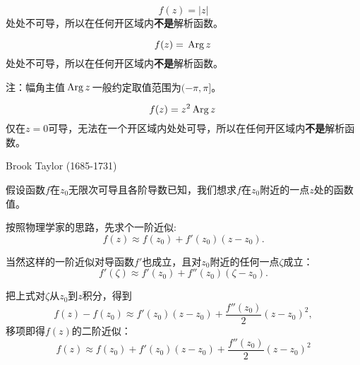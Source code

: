 \documentclass[CJK]{beamer}
\begin{document}
\begin{frame}
  \bch
  \bex
  $$f(z) = |z|$$
  处处不可导，所以在任何开区域内{\bf 不是}解析函数。
  \eex
  \ech
\end{frame}


\begin{frame}
  \bch
  \bex
  $$f(z) = \,\mathrm{Arg}\,z\,$$
  处处不可导，所以在任何开区域内{\bf 不是}解析函数。
  \eex

  \skiplines

{\scriptsize  注：幅角主值$\,\mathrm{Arg}\,z\,$一般约定取值范围为$(-\pi,\pi]$。}
  \ech
\end{frame}

\begin{frame}
  \bch
  \bex
  $$f(z) = z^2 \,\mathrm{Arg}\,z\,$$
  仅在$z=0$可导，无法在一个开区域内处处可导，所以在任何开区域内{\bf 不是}解析函数。
  \eex
  \ech
\end{frame}


\begin{frame}
  \bch
  \bcenter

  Brook Taylor (1685-1731)
  \ecenter
  \ech
\end{frame}

\begin{frame}
  \bch
  假设函数$f$在$z_0$无限次可导且各阶导数已知，我们想求$f$在$z_0$附近的一点$z$处的函数值。


  \skiplines
  
  按照物理学家的思路，先求个一阶近似:
  \begin{equation}
    f(z) \approx f(z_0) + f'(z_0)(z-z_0). \nonumber
  \end{equation}
  
  \ech
\end{frame}

\begin{frame}
  \bch
  当然这样的一阶近似对导函数$f'$也成立，且对$z_0$附近的任何一点$\zeta$成立：
$$    f'(\zeta) \approx f'(z_0) + f''(z_0)(\zeta-z_0).  $$

  把上式对$\zeta$从$z_0$到$z$积分，得到
  $$     f(z) - f(z_0) \approx f'(z_0)(z-z_0) + \frac{f''(z_0)}{2} (z-z_0)^2 ,$$
  移项即得$f(z)$的二阶近似：
  \begin{equation}
    f(z) \approx f(z_0)  + f'(z_0)(z-z_0) + \frac{f''(z_0)}{2} (z-z_0)^2 \nonumber
  \end{equation}
  
  \ech
\end{frame}
\end{document}
